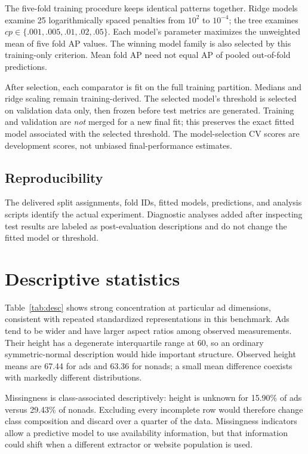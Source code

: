 \documentclass[11pt,a4paper]{article}
\begin{document}
The five-fold training procedure keeps identical patterns together. Ridge models examine 25 logarithmically spaced penalties from $10^2$ to $10^{-4}$; the tree examines $cp\in\{.001,.005,.01,.02,.05\}$. Each model's parameter maximizes the unweighted mean of five fold AP values. The winning model family is also selected by this training-only criterion. Mean fold AP need not equal AP of pooled out-of-fold predictions.

After selection, each comparator is fit on the full training partition. Medians and ridge scaling remain training-derived. The selected model's threshold is selected on validation data only, then frozen before test metrics are generated. Training and validation are \emph{not} merged for a new final fit; this preserves the exact fitted model associated with the selected threshold. The model-selection CV scores are development scores, not unbiased final-performance estimates.

\subsection{Reproducibility}
The delivered split assignments, fold IDs, fitted models, predictions, and analysis scripts identify the actual experiment. Diagnostic analyses added after inspecting test results are labeled as post-evaluation descriptions and do not change the fitted model or threshold.
\section{Descriptive statistics}
\begin{table}[H]\centering\small
\caption{Observed geometry by class: median [first quartile, third quartile], excluding unknown values.}
\label{tab:desc}
\end{table}
Table~\ref{tab:desc} shows strong concentration at particular ad dimensions, consistent with repeated standardized representations in this benchmark. Ads tend to be wider and have larger aspect ratios among observed measurements. Their height has a degenerate interquartile range at 60, so an ordinary symmetric-normal description would hide important structure. Observed height means are 67.44 for ads and 63.36 for nonads; a small mean difference coexists with markedly different distributions.

Missingness is class-associated descriptively: height is unknown for 15.90\% of ads versus 29.43\% of nonads. Excluding every incomplete row would therefore change class composition and discard over a quarter of the data. Missingness indicators allow a predictive model to use availability information, but that information could shift when a different extractor or website population is used.
\end{document}
